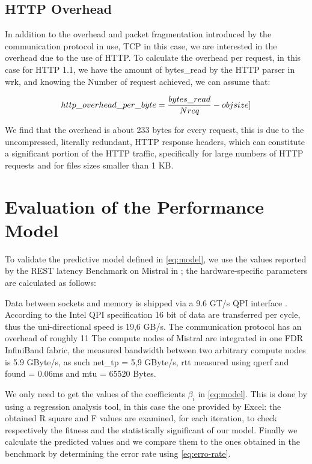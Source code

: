 \documentclass[runningheads]{llncs}
\begin{document}
\subsection{HTTP Overhead}

In addition to the overhead and packet fragmentation introduced by the communication protocol in use, TCP in this case, we are interested in the overhead due to the use of HTTP. To calculate the overhead per request, in this case for HTTP 1.1, we have the amount of bytes\_read by the HTTP parser in wrk, and knowing the Number of request achieved, we can assume that:

\[http\_overhead\_per\_byte=\frac{bytes\_read}{Nreq} - obj\-size]\]

We find that the overhead is about 233 bytes for every request, this is due to the uncompressed, literally redundant, HTTP response headers, which can constitute a significant portion of the HTTP traffic, specifically for large numbers of HTTP requests and for files sizes smaller than 1 KB.

\section{Evaluation of the Performance Model} \label{sec:evaluation}
To validate the predictive model defined in \cref{eq:model}, we use the values reported by the REST latency Benchmark on Mistral in ; the hardware-specific parameters are calculated as follows:

Data between sockets and memory is shipped via a 9.6 GT/s QPI interface \cite{intel-xeon}. According to the Intel QPI specification \cite{intel-qpi} 16 bit of data are transferred per cycle, thus the uni-directional speed is 19,6 GB/s. The communication protocol has an overhead of roughly 11 %
The compute nodes of Mistral are integrated in one FDR InfiniBand fabric, the measured bandwidth between two arbitrary compute nodes is 5.9 GByte/s, as such net\_tp = 5,9 GByte/s, rtt measured using qperf and found = 0.06ms and mtu = 65520 Bytes.

We only need to get the values of the coefficients $\beta_i$ in \cref{eq:model}. This is done by using a regression analysis tool, in this case the one provided by Excel: the obtained R square and F values are examined, for each iteration, to check respectively the fitness and the statistically significant of our model. Finally we calculate the predicted values and we compare them to the ones obtained in the benchmark by determining the error rate using \cref{eq:erro-rate}.
\end{document}
